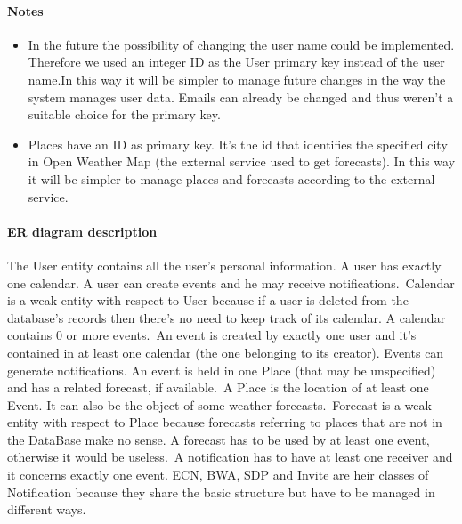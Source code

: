 \documentclass[10pt,a4paper,titlepage]{article}
\begin{document}
\paragraph{Notes}
\begin{itemize}
\item In the future the possibility of changing the user name could be implemented. Therefore we used an integer ID as the User primary key instead of the user name.In this way it will be simpler to manage future changes in the way the system manages user data. 
Emails can already be changed and thus weren't a suitable choice for the primary key.
\item Places have an ID as primary key. It's the id that identifies the specified city in Open Weather Map (the external service used to get forecasts). In this way it will be simpler to manage places and forecasts according to the external service.   
\end{itemize}
\paragraph{ER diagram description}
The User entity contains all the  user's personal information. A user has exactly one calendar. A user can create events and he may receive notifications.\
Calendar is a weak entity with respect to User because if a user is deleted from the database's records then there's no need  to keep track of its calendar. A calendar contains 0 or more events.\
An event is created by exactly one user and it's contained in at least one calendar (the one belonging to its creator). Events can generate notifications. An event is held in one Place (that may be unspecified) and has a related forecast, if available.\
A Place is the location of at least one Event. It can also be the object of some weather forecasts.\
Forecast is a weak entity with respect to Place because forecasts referring to places that are not in the DataBase make no sense. A forecast has to be used by at least one event, otherwise it would be useless.\
A notification has to have at least one receiver and it concerns exactly one event. ECN, BWA, SDP and Invite are heir classes of Notification because they share the basic structure but have to be managed in different ways.
\end{document}
